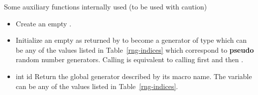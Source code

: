 Some auxiliary functions internally used (to be used with caution)
\begin{itemize}
\item {}
  \sshortdescribe Create an empty \PnlRng.
\item {}
  \sshortdescribe Initialize an empty \PnlRng as returned by
   to become a generator of type  which can be
  any of the values  listed in Table~\ref{rng-indices} which
  correspond to {\bf pseudo} random number generators.
  Calling  is equivalent to calling first
   and then . 
\item {} {int id}
  \sshortdescribe Return the global generator described by its macro name.
  The variable  can be any of the values  listed in
  Table~\ref{rng-indices}.
\end{itemize}


